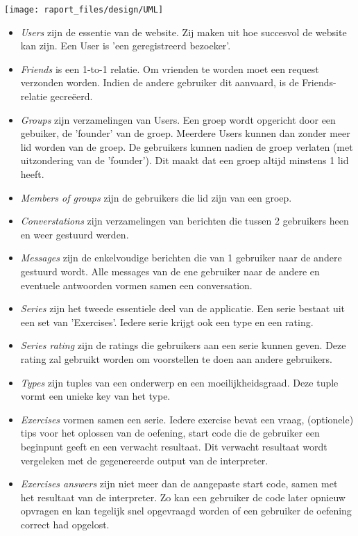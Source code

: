 \texttt{[image: raport\_files/design/UML]}

\begin{itemize}
    \item \emph{Users} zijn de essentie van de website. Zij maken uit hoe succesvol de website kan zijn.
        Een User is 'een geregistreerd bezoeker'.
    \item \emph{Friends} is een 1-to-1 relatie. Om vrienden te worden moet een request verzonden worden.
        Indien de andere gebruiker dit aanvaard, is de Friends-relatie gecre\"{e}erd.
    \item \emph{Groups} zijn verzamelingen van Users. Een groep wordt opgericht door een gebuiker, de 'founder'
        van de groep. Meerdere Users kunnen dan zonder meer lid worden van de groep. De gebruikers kunnen
        nadien de groep verlaten (met uitzondering van de 'founder'). Dit maakt dat een groep altijd minstens
        1 lid heeft.
    \item \emph{Members of groups} zijn de gebruikers die lid zijn van een groep.
    \item \emph{Converstations} zijn verzamelingen van berichten die tussen 2 gebruikers heen en weer gestuurd
        werden.
    \item \emph{Messages} zijn de enkelvoudige berichten die van 1 gebruiker naar de andere gestuurd wordt.
        Alle messages van de ene gebruiker naar de andere en eventuele antwoorden vormen samen een conversation.
    \item \emph{Series} zijn het tweede essentiele deel van de applicatie. Een serie bestaat uit een set
        van 'Exercises'. Iedere serie krijgt ook een type en een rating.
    \item \emph{Series rating} zijn de ratings die gebruikers aan een serie kunnen geven. Deze rating
        zal gebruikt worden om voorstellen te doen aan andere gebruikers.
    \item \emph{Types} zijn tuples van een onderwerp en een moeilijkheidsgraad. Deze tuple vormt een
        unieke key van het type.
    \item \emph{Exercises} vormen samen een serie. Iedere exercise bevat een vraag, (optionele) tips voor
        het oplossen van de oefening, start code die de gebruiker een beginpunt geeft en een verwacht resultaat.
        Dit verwacht resultaat wordt vergeleken met de gegenereerde output van de interpreter.
    \item \emph{Exercises answers} zijn niet meer dan de aangepaste start code, samen met het resultaat
        van de interpreter. Zo kan een gebruiker de code later opnieuw opvragen en kan tegelijk snel
        opgevraagd worden of een gebruiker de oefening correct had opgelost.
\end{itemize}
